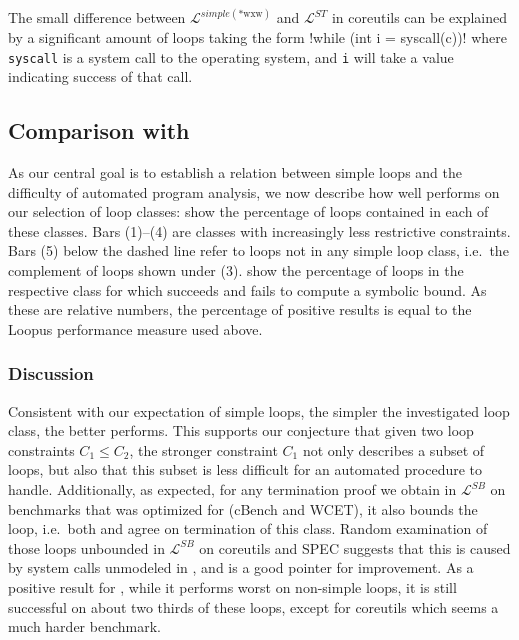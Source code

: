 The small difference between $\mathcal{L}^{simple(\text{*wxw})}$ and $\mathcal{L}^{ST}$ in coreutils can be explained by a significant amount of loops taking the form !while (int i = syscall(c))! where \texttt{syscall} is a system call to the operating system, and \texttt{i} will take a value indicating success of that call.


\subsection{Comparison with \loopus{}}

As our central goal is to establish a relation between simple loops and the difficulty of automated program analysis, we now describe how well \loopus{} performs on our selection of loop classes:  show the percentage of loops contained in each of these classes. Bars (1)--(4) are classes with increasingly less restrictive constraints. Bars (5) below the dashed line refer to loops not in any simple loop class, i.e.\ the complement of loops shown under (3).  show the percentage of loops in the respective class for which \loopus{} succeeds and fails to compute a symbolic bound. As these are relative numbers, the percentage of positive results is equal to the Loopus performance measure used above.


\subsubsection{Discussion}

Consistent with our expectation of simple loops, the simpler the investigated loop class, the better \loopus{} performs. This supports our conjecture that given two loop constraints $C_1 \le C_2$, the stronger constraint $C_1$ not only describes a subset of loops, but also that this subset is less difficult for an automated procedure to handle. Additionally, as expected, for any termination proof we obtain in $\mathcal{L}^{SB}$ on benchmarks that \loopus{} was optimized for (cBench and WCET), it also bounds the loop, i.e.\ both \sloopy{} and \loopus{} agree on termination of this class. Random examination of those loops unbounded in $\mathcal{L}^{SB}$ on coreutils and SPEC suggests that this is caused by system calls unmodeled in \loopus{}, and is a good pointer for improvement. As a positive result for \loopus{}, while it performs worst on non-simple loops, it is still successful on about two thirds of these loops, except for coreutils which seems a much harder benchmark.

